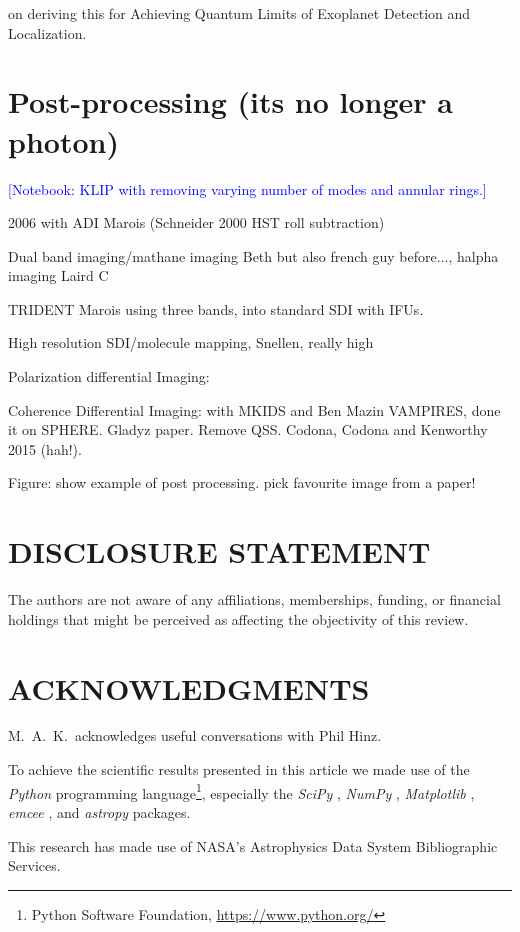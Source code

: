 \documentclass[letterpaper]{ar-1col}
\newcommand{\notebooksuggestion}[1]{\textcolor{blue}{[Notebook: #1]}}
\begin{document}
\citet{Desai23} on deriving this for Achieving Quantum Limits of Exoplanet Detection and Localization.

\lipsum[2-4]

\section{Post-processing (its no longer a photon)}

\notebooksuggestion{KLIP with removing varying number of modes and annular rings.}

2006 with ADI Marois (Schneider 2000 HST roll subtraction)

Dual band imaging/mathane imaging Beth but also french guy before..., halpha imaging Laird C

TRIDENT Marois using three bands, into standard SDI with IFUs.

High resolution SDI/molecule mapping, Snellen, really high

Polarization differential Imaging:

Coherence Differential Imaging: with MKIDS and Ben Mazin VAMPIRES, done it on SPHERE.
Gladyz paper. Remove QSS. Codona, Codona and Kenworthy 2015 (hah!).

Figure: show example of post processing. pick favourite image from a paper!

\lipsum[2-4]

\section*{DISCLOSURE STATEMENT}
The authors are not aware of any affiliations, memberships, funding, or financial holdings that
might be perceived as affecting the objectivity of this review.

\section*{ACKNOWLEDGMENTS}
M.\ A.\ K.\ acknowledges useful conversations with
Phil Hinz.


To achieve the scientific results presented in this article we made use of the \emph{Python} programming language\footnote{Python Software Foundation, \url{https://www.python.org/}}, especially the \emph{SciPy} \citep{virtanen2020}, \emph{NumPy} \citep{numpy}, \emph{Matplotlib} \citep{Matplotlib}, \emph{emcee} \citep{foreman-mackey2013}, and \emph{astropy} \citep{astropy_1,astropy_2} packages.
%

This research has made use of NASA's Astrophysics Data System Bibliographic Services.





\end{document}
